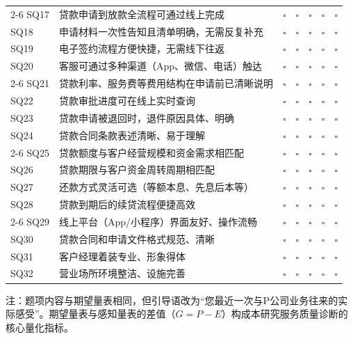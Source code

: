 \begin{center}
\begin{tabularx}{\textwidth}{l X c c c c c}
  \cmidrule{2-6}
  SQ17 & 贷款申请到放款全流程可通过线上完成 & $\square$ & $\square$ & $\square$ & $\square$ & $\square$ \\
  SQ18 & 申请材料一次性告知且清单明确，无需反复补充 & $\square$ & $\square$ & $\square$ & $\square$ & $\square$ \\
  SQ19 & 电子签约流程方便快捷，无需线下往返 & $\square$ & $\square$ & $\square$ & $\square$ & $\square$ \\
  SQ20 & 客服可通过多种渠道（App、微信、电话）触达 & $\square$ & $\square$ & $\square$ & $\square$ & $\square$ \\
  \cmidrule{2-6}
  SQ21 & 贷款利率、服务费等费用结构在申请前已清晰说明 & $\square$ & $\square$ & $\square$ & $\square$ & $\square$ \\
  SQ22 & 贷款审批进度可在线上实时查询 & $\square$ & $\square$ & $\square$ & $\square$ & $\square$ \\
  SQ23 & 贷款申请被退回时，退件原因具体、明确 & $\square$ & $\square$ & $\square$ & $\square$ & $\square$ \\
  SQ24 & 贷款合同条款表述清晰、易于理解 & $\square$ & $\square$ & $\square$ & $\square$ & $\square$ \\
  \cmidrule{2-6}
  SQ25 & 贷款额度与客户经营规模和资金需求相匹配 & $\square$ & $\square$ & $\square$ & $\square$ & $\square$ \\
  SQ26 & 贷款期限与客户资金周转周期相匹配 & $\square$ & $\square$ & $\square$ & $\square$ & $\square$ \\
  SQ27 & 还款方式灵活可选（等额本息、先息后本等） & $\square$ & $\square$ & $\square$ & $\square$ & $\square$ \\
  SQ28 & 贷款到期后的续贷流程便捷高效 & $\square$ & $\square$ & $\square$ & $\square$ & $\square$ \\
  \cmidrule{2-6}
  SQ29 & 线上平台（App/小程序）界面友好、操作流畅 & $\square$ & $\square$ & $\square$ & $\square$ & $\square$ \\
  SQ30 & 贷款合同和申请文件格式规范、清晰 & $\square$ & $\square$ & $\square$ & $\square$ & $\square$ \\
  SQ31 & 客户经理着装专业、形象得体 & $\square$ & $\square$ & $\square$ & $\square$ & $\square$ \\
  SQ32 & 营业场所环境整洁、设施完善 & $\square$ & $\square$ & $\square$ & $\square$ & $\square$ \\
  \bottomrule
\end{tabularx}
\end{center}

\vspace{1em}
{\small 注：题项内容与期望量表相同，但引导语改为“您最近一次与P公司业务往来的实际感受”。期望量表与感知量表的差值（$G = P - E$）构成本研究服务质量诊断的核心量化指标。}

